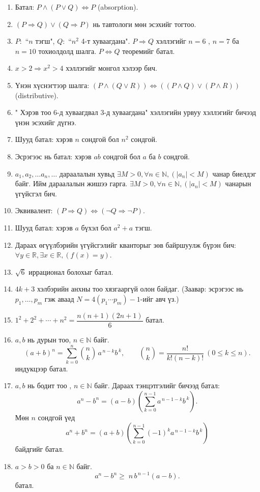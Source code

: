 \begin{enumerate}
  \item Батал: $P\land(P\lor Q)\Leftrightarrow P$ (absorption).
  \item $(P\Rightarrow Q)\lor(Q\Rightarrow P)$ нь тавтологи мөн эсэхийг тогтоо.
  \item $P:$ ``$n$ тэгш", $Q:$ ``$n^2$ 4-т хуваагдана". $P\Rightarrow Q$ хэллэгийг $n=6$ , $n=7$ ба $n=10$ тохиолдолд шалга. $P\Leftrightarrow Q$ теоремийг батал.
  \item $x>2 \Rightarrow x^2>4$ хэллэгийг монгол хэлээр бич.
  \item Үнэн хүснэгтээр шалга: $(P\land(Q\lor R))\Leftrightarrow((P\land Q)\lor(P\land R))$ (distributive).
  \item " Хэрэв тоо 6-д хуваагдвал 3-д хуваагдана" хэллэгийн урвуу хэллэгийг бичээд үнэн эсэхийг дүгнэ.
  \item Шууд батал: хэрэв $n$ сондгой бол $n^2$ сондгой.
  \item Эсрэгээс нь батал: хэрэв $ab$ сондгой бол $a$ ба $b$ сондгой.
  \item $a_1, a_2, \ldots a_n, \ldots$ дараалалын хувьд $\exists M > 0,  \forall n \in \mathbb{N}, (|a_n| < M)$ чанар биелдэг байг. Ийм дараалалын жишээ гарга. $\exists M > 0,  \forall n \in \mathbb{N}, (|a_n| < M)$ чанарын үгүйсгэл бич.
  \item Эквивалент: $(P\Rightarrow Q)\Leftrightarrow(\lnot Q\Rightarrow\lnot P)$.
  \item Шууд батал: хэрэв $a$ бүхэл бол $a^2+a$ тэгш.
  \item Дараах өгүүлбэрийн үгүйсгэлийг кванторыг зөв байршуулж бүрэн бич:\\
 $\forall y \in \mathbb{R}, \exists x \in \mathbb{R}, (f(x) = y)$.
  \item $\sqrt{6}$ иррационал болохыг батал.
  \item $4k+3$ хэлбэрийн анхны тоо хязгааргүй олон байдаг.
        (Заавар: эсрэгээс нь $p_1,\dots,p_m$ гэж аваад $N=4(p_1\cdots p_m)-1$-ийг авч үз.)
        \item $1^2+2^2+\cdots+n^2=\dfrac{n(n+1)(2n+1)}{6}$ батал. 
  \item $a,b$ нь дурын тоо, $n\in\mathbb{N}$ байг. 
\[
(a+b)^n=\sum_{k=0}^{n}\binom{n}{k}\,a^{\,n-k}b^{\,k},
\qquad
\binom{n}{k}=\frac{n!}{k!(n-k)!}\ (0\le k\le n).
\] индукцээр батал. 
  \item $a,b$ нь бодит тоо , $n\in\mathbb{N}$ байг. Дараах тэнцэтгэлийг бичээд батал:
\[
a^n-b^n=(a-b)(\sum_{k=0}^{n-1} a^{\,n-1-k} b^{\,k}).
\]
Мөн $n$ сондгой үед
\[
a^n+b^n=(a+b)(\sum_{k=0}^{n-1}(-1)^k a^{\,n-1-k} b^{\,k})
\]
байдгийг батал.
\item $a>b>0$ ба $n\in\mathbb{N}$ байг. 
\[
a^n-b^n \ge\; n\,b^{\,n-1}(a-b).
\]  батал.
\end{enumerate}

